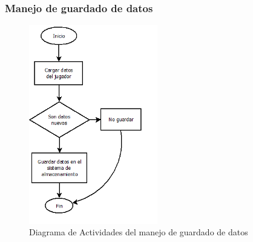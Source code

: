 \subsubsection{Manejo de guardado de datos}
\begin{figure}[H]
    \centering
    \includegraphics[width=0.5\textwidth]{recursos/Imagenes/DiagramaDatos.png} 
    \caption{Diagrama de Actividades del manejo de guardado de datos}
    \label{fig:mi_imagen}
\end{figure}